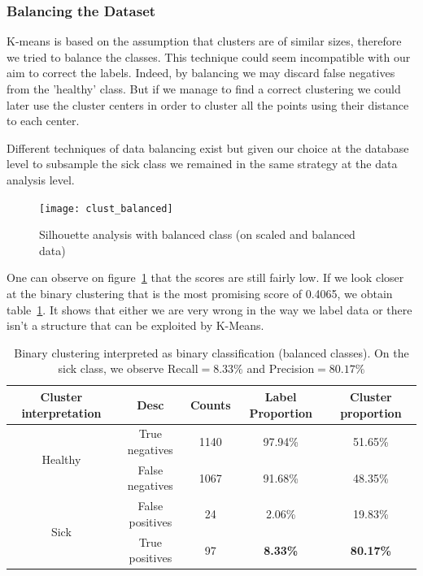 \subsubsection{Balancing the Dataset}
K-means is based on the assumption that clusters are of similar sizes, therefore we tried to balance the classes. This technique could seem incompatible with our aim to correct the labels. Indeed, by balancing we may discard false negatives from the 'healthy' class. But if we manage to find a correct clustering we could later use the cluster centers in order to cluster all the points using their distance to each center. 

Different techniques of data balancing exist but given our choice at the database level to subsample the sick class we remained in the same strategy at the data analysis level. 


\begin{figure}[ht]
    \begin{center}
    \texttt{[image: clust\_balanced]}
    \end{center}
    \caption{Silhouette analysis with balanced class (on scaled and balanced data)}
    \label{clust_bal}
\end{figure}

One can observe on figure~\ref{clust_bal} that the scores are still fairly low. If we look closer at the binary clustering that is the most promising score of 0.4065, we obtain table~\ref{clust_clas}. It shows that either we are very wrong in the way we label data or there isn't a structure that can be exploited by K-Means.

\begin{table}[h]
\begin{center}
\begin{tabular}{c c c c c}
\hline
\textbf{Cluster interpretation} & \textbf{Desc} & \textbf{Counts} & \textbf{Label Proportion} & \textbf{Cluster proportion}\\ 
\hline\hline
\multirow{2}{*}{Healthy}  	& True negatives & 1140 & 97.94\% & 51.65\%\\
						  	& False negatives & 1067 & 91.68\% & 48.35\%\\
\hline
\multirow{2}{*}{Sick}  	& False positives & 24 & 2.06\% & 19.83\%\\
						  	& True positives & 97 & \textbf{8.33\%} & \textbf{80.17\%}\\
\end{tabular}
\end{center}
\caption{\label{clust_clas}Binary clustering interpreted as binary classification (balanced classes). On the sick class, we observe Recall$=8.33\%$ and Precision$=80.17\%$}
\end{table}


